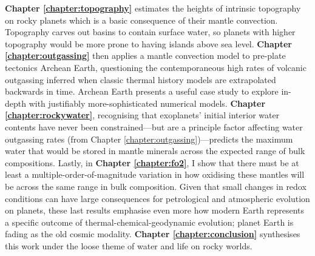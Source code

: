 \textbf{Chapter \ref{chapter:topography}} estimates the heights of intrinsic topography on rocky planets which is a basic consequence of their mantle convection. Topography carves out basins to contain surface water, so planets with higher topography would be more prone to having islands above sea level. \textbf{Chapter \ref{chapter:outgassing}} then applies a mantle convection model to pre-plate tectonics Archean Earth, questioning the contemporaneous high rates of volcanic outgassing inferred when classic thermal history models \citep[e.g.,][]{schubert_whole_1980} are extrapolated backwards in time. Archean Earth presents a useful case study to explore in-depth with justifiably more-sophisticated numerical models. %
\textbf{Chapter \ref{chapter:rockywater}}, recognising that exoplanets' initial interior water contents have never been constrained---but are a principle factor affecting water outgassing rates (from Chapter \ref{chapter:outgassing})---predicts the maximum water that would be stored in mantle minerals across the expected range of bulk compositions. Lastly, in \textbf{Chapter \ref{chapter:fo2}}, I show that there must be at least a multiple-order-of-magnitude variation in how oxidising these mantles will be across the same range in bulk composition. Given that small changes in redox conditions can have large consequences for petrological and atmospheric evolution on planets, these last results emphasise even more how modern Earth represents a specific outcome of thermal-chemical-geodynamic evolution; planet Earth is fading as the old cosmic modality. \textbf{Chapter \ref{chapter:conclusion}} synthesises this work under the loose theme of water and life on rocky worlds. 

